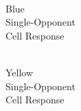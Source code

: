 \documentclass[journal,onecolumn]{IEEEtran}
\begin{document}
\begin{figure}[H]
\begin{subfigure}{0.15\textwidth}
        \caption{\\ Blue\\ Single-Opponent\\ Cell Response}
    \end{subfigure}
    \begin{subfigure}{0.15\textwidth}
        \centering
        \captionsetup{justification=centering}
        \caption{\\ Yellow\\ Single-Opponent\\ Cell Response}
    \end{subfigure}%
    \par \bigskip%
    \begin{subfigure}{0.15\textwidth}
        \centering
        \captionsetup{justification=centering}

\end{subfigure}
\end{figure}
\end{document}
